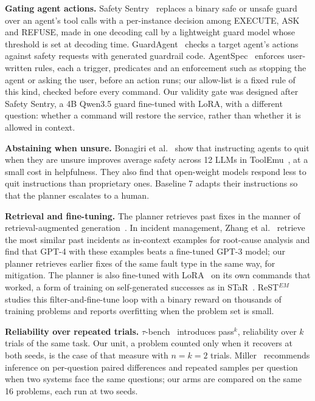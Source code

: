 \documentclass[10pt,conference]{IEEEtran}
\begin{document}
\textbf{Gating agent actions.} Safety Sentry~\cite{safetysentry} replaces a binary safe or unsafe
guard over an agent's tool calls with a per-instance decision among EXECUTE, ASK and REFUSE, made
in one decoding call by a lightweight guard model whose threshold is set at decoding time.
GuardAgent~\cite{guardagent} checks a target agent's actions against safety requests with
generated guardrail code. AgentSpec~\cite{agentspec} enforces user-written rules, each a trigger,
predicates and an enforcement such as stopping the agent or asking the user, before an action runs;
our allow-list is a fixed rule of this kind, checked before every command. Our validity gate was
designed after Safety Sentry, a 4B Qwen3.5 guard fine-tuned with LoRA, with a different question:
whether a command will restore the service, rather than whether it is allowed in context.

\textbf{Abstaining when unsure.} Bonagiri et al.~\cite{quitting} show that instructing agents to
quit when they are unsure improves average safety across 12 LLMs in ToolEmu~\cite{toolemu}, at a small
cost in helpfulness. They also find that open-weight models respond less to quit instructions than
proprietary ones. Baseline 7 adapts their instructions so that the planner escalates to a human.

\textbf{Retrieval and fine-tuning.} The planner retrieves past fixes in the manner of
retrieval-augmented generation~\cite{rag}. In incident management, Zhang et al.~\cite{iclrca}
retrieve the most similar past incidents as in-context examples for root-cause analysis and find
that GPT-4 with these examples beats a fine-tuned GPT-3 model; our planner retrieves earlier fixes
of the same fault type in the same way, for mitigation. The planner is also fine-tuned with
LoRA~\cite{lora} on its own commands that worked, a form of training on self-generated successes as
in STaR~\cite{star}. ReST$^{EM}$~\cite{restem} studies this filter-and-fine-tune loop with a binary
reward on thousands of training problems and reports overfitting when the problem set is small.

\textbf{Reliability over repeated trials.} $\tau$-bench~\cite{taubench} introduces pass$^k$,
reliability over $k$ trials of the same task. Our unit, a problem counted only when it recovers at
both seeds, is the case of that measure with $n=k=2$ trials. Miller~\cite{errorbars} recommends
inference on per-question paired differences and repeated samples per question when two systems
face the same questions; our arms are compared on the same 16 problems, each run at two seeds.
\end{document}
